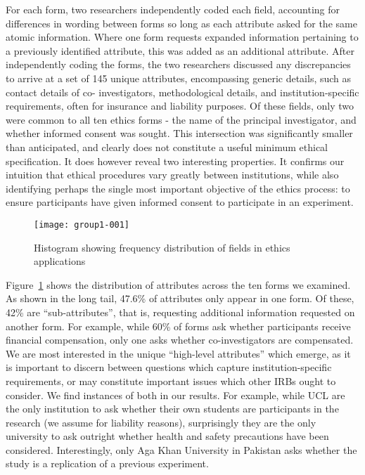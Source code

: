 For each form, two researchers independently coded each field, accounting for
differences in wording between forms so long as each attribute asked for the
same atomic information. Where one form requests expanded information
pertaining to a previously identified attribute, this was added as an
additional attribute. After independently coding the forms, the two
researchers discussed any discrepancies to arrive at a set of 145 unique
attributes, encompassing generic details, such as contact details of co-
investigators, methodological details, and institution-specific requirements,
often for insurance and liability purposes. Of these fields, only two were
common to all ten ethics forms - the name of the principal investigator, and
whether informed consent was sought. This intersection was significantly
smaller than anticipated, and clearly does not constitute a useful minimum
ethical specification. It does however reveal two interesting properties. It
confirms our intuition that ethical procedures vary greatly between
institutions, while also identifying perhaps the single most important
objective of the ethics process: to ensure participants have given informed
consent to participate in an experiment.

\begin{figure}
\begin{minipage}{\linewidth}
\texttt{[image: group1-001]}
\caption{\label{p:ethicsFreq}Histogram showing frequency distribution of fields in ethics applications}
\end{minipage}
\end{figure}

Figure~\ref{p:ethicsFreq} shows the distribution of attributes across the ten
forms we examined. As shown in the long tail, 47.6\% of attributes only appear
in one form. Of these, 42\% are ``sub-attributes'', that is, requesting
additional information requested on another form. For example, while 60\% of
forms ask whether participants receive financial compensation, only one asks
whether co-investigators are compensated. We are most interested in the unique
``high-level attributes'' which emerge, as it is important to discern between
questions which capture institution-specific requirements, or may constitute
important issues which other IRBs ought to consider. We find instances of both
in our results. For example, while UCL are the only institution to ask whether
their own students are participants in the research (we assume for liability
reasons), surprisingly they are the only university to ask outright whether
health and safety precautions have been considered. Interestingly, only Aga Khan
University in Pakistan asks whether the study is a replication of a previous experiment.

